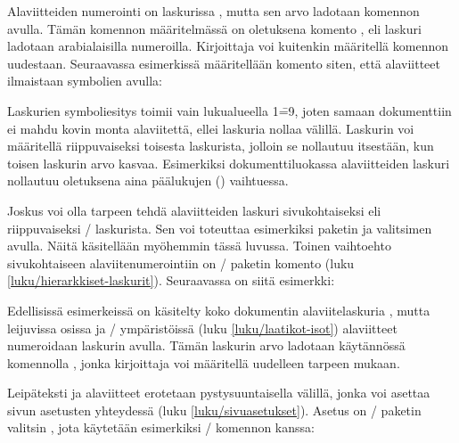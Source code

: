 \noindent
Alaviitteiden numerointi on laskurissa , mutta sen
arvo ladotaan komennon  avulla. Tämän komennon
määritelmässä on oletuksena komento
, eli laskuri ladotaan
arabialaisilla numeroilla. Kirjoittaja voi kuitenkin määritellä komennon
uudestaan. Seuraavassa esimerkissä määritellään komento siten, että
alaviitteet ilmaistaan symbolien avulla:

\begin{koodilohkosis}
\renewcommand{\thefootnote}{\fnsymbol{footnote}}
\end{koodilohkosis}

\noindent
Laskurien symboliesitys toimii vain lukualueella 1\==9, joten samaan
dokumenttiin ei mahdu kovin monta alaviitettä, ellei laskuria nollaa
välillä. Laskurin voi määritellä riippuvaiseksi toisesta laskurista,
jolloin se nollautuu itsestään, kun toisen laskurin arvo kasvaa.
Esimerkiksi dokumenttiluokassa  alaviitteiden laskuri
nollautuu oletuksena aina päälukujen () vaihtuessa.

Joskus voi olla tarpeen tehdä alaviitteiden laskuri sivukohtaiseksi eli
riippuvaiseksi \-/ laskurista. Sen voi toteuttaa
esimerkiksi paketin  ja valitsimen 
avulla. Näitä käsitellään myöhemmin tässä luvussa. Toinen vaihtoehto
sivukohtaiseen alaviitenumerointiin on \-/ paketin
komento  (luku
\ref{luku/hierarkkiset-laskurit}). Seuraavassa on siitä esimerkki:

\begin{koodilohkosis}
\end{koodilohkosis}

\noindent
Edellisissä esimerkeissä on käsitelty koko dokumentin alaviitelaskuria
, mutta leijuvissa osissa ja \-/
ympäristöissä (luku \ref{luku/laatikot-isot}) alaviitteet numeroidaan
laskurin  avulla. Tämän laskurin arvo ladotaan
käytännössä komennolla , jonka kirjoittaja voi
määritellä uudelleen tarpeen mukaan.

Leipäteksti ja alaviitteet erotetaan pystysuuntaisella välillä, jonka
voi asettaa sivun asetusten yhteydessä (luku \ref{luku/sivuasetukset}).
Asetus on \-/ paketin valitsin ,
jota käytetään esimerkiksi \-/ komennon kanssa:


